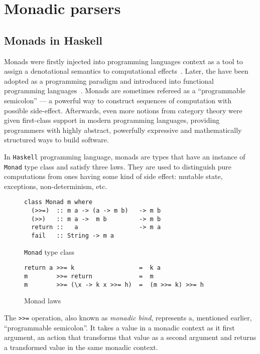   \section{Monadic parsers}
  \label{cpt-parsers:monadic}

    \subsection{Monads in Haskell}
      Monads were firstly injected into programming languages context as a tool to
      assign a denotational semantics to computational effects~\cite{Moggi:1991:NCM:116981.116984}. Later, the have been adopted as a programming
      paradigm and introduced into functional programming languages~\cite{Wadler:1992:EFP:143165.143169}. Monads are sometimes refereed as a ``programmable semicolon'' --- a powerful way to construct sequences of computation with possible side-effect. Afterwards, even more notions from category theory were given first-class support in modern programming languages, providing programmers with highly abstract, powerfully expressive and mathematically structured ways to build software.

      In \texttt{Haskell} programming language, monads are types that have an instance of \texttt{Monad} type class and satisfy three laws. They are used
      to distinguish pure computations from ones having some kind of side effect:
      mutable state, exceptions, non-determinism, etc.

      \begin{figure}[h]
      \begin{lstlisting}
class Monad m where
  (>>=)  :: m a -> (a -> m b)   -> m b
  (>>)   :: m a ->  m b         -> m b
  return ::   a                 -> m a
  fail   :: String -> m a
      \end{lstlisting}
      \caption{\texttt{Monad} type class}
      \label{listing:monadClass}
      \end{figure}

      \begin{figure}[h]
      \begin{lstlisting}
return a >>= k                  =  k a
m        >>= return             =  m
m        >>= (\x -> k x >>= h)  =  (m >>= k) >>= h
      \end{lstlisting}
      \caption{Monad laws}
      \label{listing:monadLaws}
      \end{figure}

      The \lstinline{>>=} operation, also known as \emph{monadic bind}, represents
      a, mentioned earlier, ``programmable semicolon''. It takes a value in a monadic context as it first argument, an action that transforms that value as a second argument and returns a transformed value in the same monadic context.

